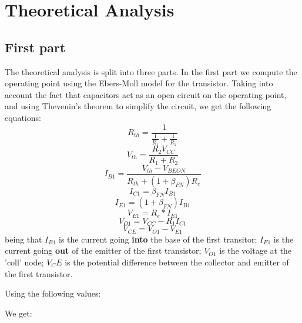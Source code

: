 \section{Theoretical Analysis}
\label{sec:analysis}

\subsection{First part}
The theoretical analysis is split into three parts. In the first part we compute the operating point using the Ebers-Moll model for the transistor. Taking into account the fact that capacitors act as an open circuit on the operating point, and using Thevenin's theorem to simplify the circuit, we get the following equations:
\begin{equation*}
    R_{th} = \frac{1}{\frac{1}{R_{1}} + \frac{1}{R_{2}}}
\end{equation*}
\begin{equation*}
    V_{th} = \frac{R_{2}V_{CC}}{R_{1}+R_{2}}
\end{equation*}
\begin{equation*}
    I_{B1} = \frac{V_{th} - V_{BEON}}{R_{th} + (1+\beta_{FN})R_{e}}
\end{equation*}
\begin{equation*}
    I_{C1} = \beta_{FN} I_{B1}
\end{equation*}
\begin{equation*}
    I_{E1} = (1+\beta_{FN})I_{B1}
\end{equation*}
\begin{equation*}
    V_{E1} = R_{e}*I_{E1}
\end{equation*}
\begin{equation*}
    V_{O1} = V_{CC}-R_{1}I_{C1}
\end{equation*}
\begin{equation*}
    V_{CE} = V_{O1}-V_{E1}
\end{equation*}
being that $I_{B1}$ is the current going \textbf{into} the base of the first transitor; $I_{E1}$ is the current going \textbf{out} of the emitter of the first transistor; $V_{O1}$ is the voltage at the 'coll' node; $V_CE$ is the potential difference between the collector and emitter of the first transistor. 

Using the following values:



We get:




